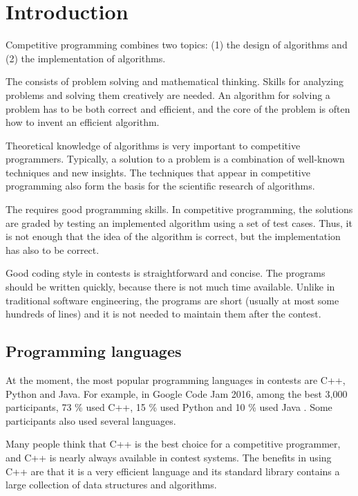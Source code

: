 \chapter{Introduction}

Competitive programming combines two topics:
(1) the design of algorithms and (2) the implementation of algorithms.

The  consists of problem solving
and mathematical thinking.
Skills for analyzing problems and solving them
creatively are needed.
An algorithm for solving a problem
has to be both correct and efficient,
and the core of the problem is often
how to invent an efficient algorithm.

Theoretical knowledge of algorithms
is very important to competitive programmers.
Typically, a solution to a problem is
a combination of well-known techniques and
new insights.
The techniques that appear in competitive programming
also form the basis for the scientific research
of algorithms.

The  requires good
programming skills.
In competitive programming, the solutions
are graded by testing an implemented algorithm
using a set of test cases.
Thus, it is not enough that the idea of the
algorithm is correct, but the implementation has
also to be correct.

Good coding style in contests is
straightforward and concise.
The programs should be written quickly,
because there is not much time available.
Unlike in traditional software engineering,
the programs are short (usually at most some
hundreds of lines) and it is not needed to 
maintain them after the contest.

\section{Programming languages}


At the moment, the most popular programming
languages in contests are C++, Python and Java.
For example, in Google Code Jam 2016,
among the best 3,000 participants,
73 \% used C++,
15 \% used Python and
10 \% used Java \cite{goo16}.
Some participants also used several languages.

Many people think that C++ is the best choice
for a competitive programmer,
and C++ is nearly always available in
contest systems.
The benefits in using C++ are that
it is a very efficient language and
its standard library contains a 
large collection
of data structures and algorithms.

